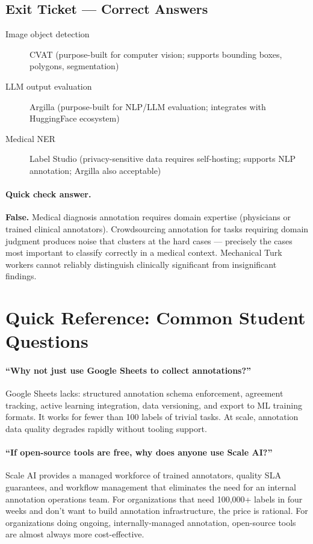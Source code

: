 \subsection{Exit Ticket --- Correct Answers}

\begin{description}
    \item[Image object detection] CVAT (purpose-built for computer vision; supports bounding boxes, polygons, segmentation)
    \item[LLM output evaluation] Argilla (purpose-built for NLP/LLM evaluation; integrates with HuggingFace ecosystem)
    \item[Medical NER] Label Studio (privacy-sensitive data requires self-hosting; supports NLP annotation; Argilla also acceptable)
\end{description}

\paragraph{Quick check answer.}
\textbf{False.} Medical diagnosis annotation requires domain expertise (physicians or trained clinical annotators). Crowdsourcing annotation for tasks requiring domain judgment produces noise that clusters at the hard cases --- precisely the cases most important to classify correctly in a medical context. Mechanical Turk workers cannot reliably distinguish clinically significant from insignificant findings.

\section{Quick Reference: Common Student Questions}

\paragraph{``Why not just use Google Sheets to collect annotations?''}
Google Sheets lacks: structured annotation schema enforcement, agreement tracking, active learning integration, data versioning, and export to ML training formats. It works for fewer than 100 labels of trivial tasks. At scale, annotation data quality degrades rapidly without tooling support.

\paragraph{``If open-source tools are free, why does anyone use Scale AI?''}
Scale AI provides a managed workforce of trained annotators, quality SLA guarantees, and workflow management that eliminates the need for an internal annotation operations team. For organizations that need 100,000+ labels in four weeks and don't want to build annotation infrastructure, the price is rational. For organizations doing ongoing, internally-managed annotation, open-source tools are almost always more cost-effective.

